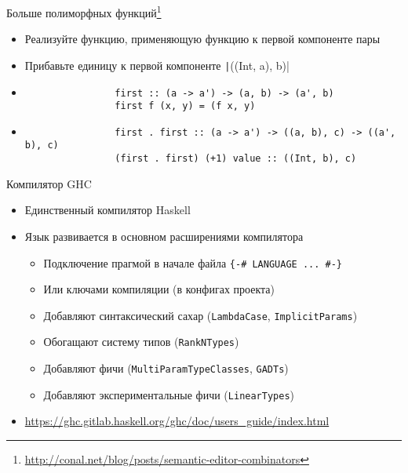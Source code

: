     \begin{frame}[fragile]{Больше полиморфных функций\footnote{\color{blue}\url{http://conal.net/blog/posts/semantic-editor-combinators}}}
        \begin{itemize}
            \item[\todo] Реализуйте функцию, применяющую функцию к первой компоненте пары
            \item[\todo] Прибавьте единицу к первой компоненте \texttt|((Int, a), b)|
            \item[\answer] \pause
            \begin{verbatim}
                first :: (a -> a') -> (a, b) -> (a', b)
                first f (x, y) = (f x, y)
            \end{verbatim}
            \item[\answer] \pause
            \begin{verbatim}
                first . first :: (a -> a') -> ((a, b), c) -> ((a', b), c)
                (first . first) (+1) value :: ((Int, b), c)
            \end{verbatim}
        \end{itemize}
    \end{frame}


    \begin{frame}{Компилятор GHC}
        \begin{itemize}
            \item Единственный компилятор Haskell
            \item Язык развивается в основном расширениями компилятора
            \begin{itemize}
                \item Подключение прагмой в начале файла \texttt{\{-\# LANGUAGE ... \#-\}}
                \item Или ключами компиляции (в конфигах проекта)
                \item Добавляют синтаксический сахар (\texttt{LambdaCase}, \texttt{ImplicitParams})
                \item Обогащают систему типов (\texttt{RankNTypes})
                \item Добавляют фичи (\texttt{MultiParamTypeClasses}, \texttt{GADTs})
                \item Добавляют экспериментальные фичи (\texttt{LinearTypes})
            \end{itemize}
            \item \href{https://ghc.gitlab.haskell.org/ghc/doc/users_guide/index.html}{\color{blue} https://ghc.gitlab.haskell.org/ghc/doc/users\_guide/index.html}
        \end{itemize}
    \end{frame}

